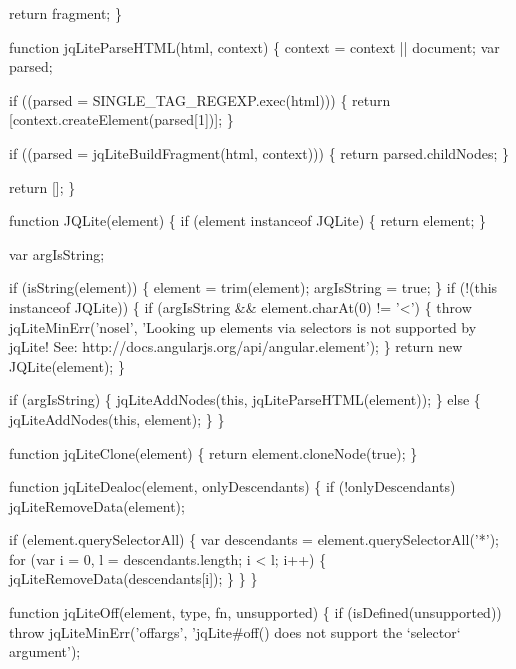 \begin{DoxyCodeInclude}
{  \textcolor{keywordflow}{return} fragment;
\}

\textcolor{keyword}{function} jqLiteParseHTML(html, context) \{
  context = context || document;
  var parsed;

  \textcolor{keywordflow}{if} ((parsed = SINGLE\_TAG\_REGEXP.exec(html))) \{
    \textcolor{keywordflow}{return} [context.createElement(parsed[1])];
  \}

  \textcolor{keywordflow}{if} ((parsed = jqLiteBuildFragment(html, context))) \{
    \textcolor{keywordflow}{return} parsed.childNodes;
  \}

  \textcolor{keywordflow}{return} [];
\}

\textcolor{keyword}{function} JQLite(element) \{
  \textcolor{keywordflow}{if} (element instanceof JQLite) \{
    \textcolor{keywordflow}{return} element;
  \}

  var argIsString;

  \textcolor{keywordflow}{if} (isString(element)) \{
    element = trim(element);
    argIsString = \textcolor{keyword}{true};
  \}
  \textcolor{keywordflow}{if} (!(\textcolor{keyword}{this} instanceof JQLite)) \{
    \textcolor{keywordflow}{if} (argIsString && element.charAt(0) != \textcolor{charliteral}{'<'}) \{
      \textcolor{keywordflow}{throw} jqLiteMinErr(\textcolor{stringliteral}{'nosel'}, \textcolor{stringliteral}{'Looking up elements via selectors is not supported by jqLite! See:
       http://docs.angularjs.org/api/angular.element'});
    \}
    \textcolor{keywordflow}{return} \textcolor{keyword}{new} JQLite(element);
  \}

  \textcolor{keywordflow}{if} (argIsString) \{
    jqLiteAddNodes(\textcolor{keyword}{this}, jqLiteParseHTML(element));
  \} \textcolor{keywordflow}{else} \{
    jqLiteAddNodes(\textcolor{keyword}{this}, element);
  \}
\}

\textcolor{keyword}{function} jqLiteClone(element) \{
  \textcolor{keywordflow}{return} element.cloneNode(\textcolor{keyword}{true});
\}

\textcolor{keyword}{function} jqLiteDealoc(element, onlyDescendants) \{
  \textcolor{keywordflow}{if} (!onlyDescendants) jqLiteRemoveData(element);

  \textcolor{keywordflow}{if} (element.querySelectorAll) \{
    var descendants = element.querySelectorAll(\textcolor{charliteral}{'*'});
    \textcolor{keywordflow}{for} (var i = 0, l = descendants.length; i < l; i++) \{
      jqLiteRemoveData(descendants[i]);
    \}
  \}
\}

\textcolor{keyword}{function} jqLiteOff(element, type, fn, unsupported) \{
  \textcolor{keywordflow}{if} (isDefined(unsupported)) \textcolor{keywordflow}{throw} jqLiteMinErr(\textcolor{stringliteral}{'offargs'}, \textcolor{stringliteral}{'jqLite#off() does not support the `selector`
       argument'});

}
\end{DoxyCodeInclude}
